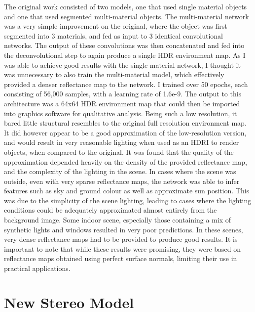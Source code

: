 \documentclass[ %
                    author={Gavin Parker},
                supervisor={Dr. Neill Campbell},
                    degree={MEng},
                     title={Deep Siamese Networks for Illumination Estimation from Stereo Images},
                  subtitle={},
                      type={research},
                      year={2018} ]{dissertation}
\begin{document}
The original work consisted of two models, one that used single material objects and one that used segmented multi-material objects. The multi-material network was a very simple improvement on the original, where the object was first segmented into 3 materials, and fed as input to 3 identical convolutional networks. The output of these convolutions was then concatenated and fed into the deconvolutional step to again produce a single HDR environment map. As I was able to achieve good results with the single material network, I thought it was unnecessary to also train the multi-material model, which effectively provided a denser reflectance map to the network. I trained over 50 epochs, each consisting of 56,000 samples, with a learning rate of 1.6e-9. The output to this architecture was a 64x64 HDR environment map that could then be imported into graphics software for qualitative analysis. Being such a low resolution, it bared little structural resembles to the original full resolution environment map. It did however appear to be a good approximation of the low-resolution version, and would result in very reasonable lighting when used as an HDRI to render objects, when compared to the original.
It was found that the quality of the approximation depended heavily on the density of the provided reflectance map, and the complexity of the lighting in the scene. In cases where the scene was outside, even with very sparse reflectance maps, the network was able to infer features such as sky and ground colour as well as approximate sun position. This was due to the simplicity of the scene lighting, leading to cases where the lighting conditions could be adequately approximated almost entirely from the background image. Some indoor scene, especially those containing a mix of synthetic lights and windows resulted in very poor predictions. In these scenes, very dense reflectance maps had to be provided to produce good results. 
\newline
It is important to note that while these results were promising, they were based on reflectance maps obtained using perfect surface normals, limiting their use in practical applications. 

\chapter{New Stereo Model}
\end{document}
